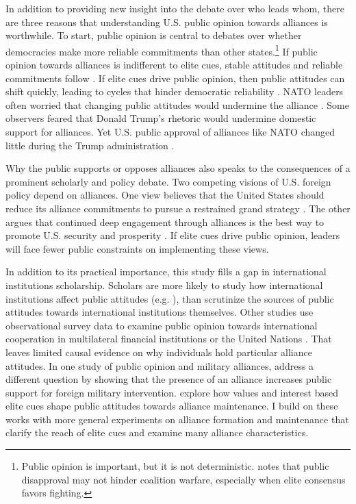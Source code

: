 \documentclass[12pt]{article}
\begin{document}
In addition to providing new insight into the debate over who leads whom, there are three reasons that understanding U.S. public opinion towards alliances is worthwhile. 
To start, public opinion is central to debates over whether democracies make more reliable commitments than other states.\footnote{Public opinion is important, but it is not deterministic. \citet{Kreps2010} notes that public disapproval may not hinder coalition warfare, especially when elite consensus favors fighting.} 
If public opinion towards alliances is indifferent to elite cues, stable attitudes and reliable commitments follow \citep{Gaubatz1996}.
If elite cues drive public opinion, then public attitudes can shift quickly, leading to cycles that hinder democratic reliability \citep{GartzkeGleditsch2004}.
NATO leaders often worried that changing public attitudes would undermine the alliance \citep{Sayle2019}.  
Some observers feared that Donald Trump's rhetoric would undermine domestic support for alliances.
Yet U.S. public approval of alliances like NATO changed little during the Trump administration \citep{PewNATO2020}. 


Why the public supports or opposes alliances also speaks to the consequences of a prominent scholarly and policy debate. 
Two competing visions of U.S. foreign policy depend on alliances. 
One view believes that the United States should reduce its alliance commitments to pursue a restrained grand strategy \citep{Preble2009, Posen2014}.
The other argues that continued deep engagement through alliances is the best way to promote U.S. security and prosperity \citep{Brooksetal2013, BrandsFeaver2017}. 
If elite cues drive public opinion, leaders will face fewer public constraints on implementing these views. 


In addition to its practical importance, this study fills a gap in international institutions scholarship. 
Scholars are more likely to study how international institutions affect public attitudes (e.g. \citep{KayaWalker2014, Greenhill2020}), than scrutinize the sources of public attitudes towards international institutions themselves. 
Other studies use observational survey data to examine public opinion towards international cooperation in multilateral financial institutions \citep{Edwards2009} or the United Nations \citep{Torgler2008, DellmuthTallberg2015}. 
That leaves limited causal evidence on why individuals hold particular alliance attitudes.
In one study of public opinion and military alliances, \citet{TomzWeeks2021} address a different question by showing that the presence of an alliance increases public support for foreign military intervention. 
\citet{Chuetal2021} explore how values and interest based elite cues shape public attitudes towards alliance maintenance. 
I build on these works with more general experiments on alliance formation and maintenance that clarify the reach of elite cues and examine many alliance characteristics. 
\end{document}

